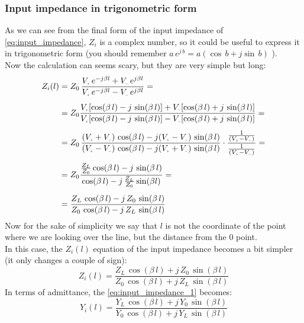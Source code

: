 \subsubsection*{Input impedance in trigonometric form}
As we can see from the final form of the input impedance of \cref{eq:input_impedance}, $Z_i$ is a complex number, so it could be useful to express it in trigonometric form (you should remember $a\,e^{j\,b}=a(\cos\,b+j\sin\,b)$ ).\\
Now the calculation can seems scary, but they are very simple but long:
\begin{align}
    \begin{split}
      Z_i(l)&=Z_0\,\frac{V\bottomPlus \,e^{-j\beta l}+V\bottomMinus \,e^{j\beta l}}{V\bottomPlus \,e^{-j\beta l}-V\bottomMinus \,e^{j\beta l}}=\\[5pt]
      &=Z_0\frac{V\bottomPlus [\cos(\beta\, l)-j \, \sin(\beta\, l)]+V\bottomMinus [\cos(\beta\, l)+j \, \sin(\beta\, l)]}{V\bottomPlus [\cos(\beta\, l)-j \, \sin(\beta\, l)]-V\bottomMinus [\cos(\beta\, l)+j \, \sin(\beta\, l)]}=\\[5pt]
      &=Z_0\,\frac{(V\bottomPlus +V\bottomMinus )\,\cos(\beta\,l)-j(V\bottomPlus -V\bottomMinus )\,\sin(\beta\, l)}{(V\bottomPlus -V\bottomMinus )\,\cos(\beta\,l)-j(V\bottomPlus +V\bottomMinus )\,\sin(\beta\, l)}\cdot \frac{\frac{1}{(V\bottomPlus-V\bottomMinus)}}{\frac{1}{(V\bottomPlus-V\bottomMinus)}}=\\[5pt]
      &=Z_0\frac{\frac{Z_L}{Z_0}\cos(\beta\,l)-j\,\sin(\beta \,l)}{\cos(\beta\, l)-j\,\frac{Z_L}{Z_0}\sin(\beta l)}=\\[5pt]
      &=\frac{Z_L\,\cos(\beta \,l)-j\,Z_0\,\sin(\beta \, l)}{Z_0\, \cos(\beta \, l)-j\,Z_L\,\sin(\beta \, l)}
    \end{split}
\end{align}
Now for the sake of simplicity we say that $l$ is not the coordinate of the point where we are looking over the line, but the distance from the $0$ point.\\
In this case, the $Z_i(l)$ equation of the input impedance becomes a bit simpler (it only changes a couple of sign):
\begin{equation}\label{eq:input_impedance_1}
    Z_i(l)=\frac{Z_L\,\cos(\beta \,l)+j\,Z_0\,\sin(\beta \, l)}{Z_0\, \cos(\beta \, l)+j\,Z_L\,\sin(\beta \, l)}
\end{equation}
In terms of admittance, the \cref{eq:input_impedance_1} becomes:
\begin{equation}
    Y_i(l)=\frac{Y_L\,\cos(\beta \,l)+j\,Y_0\,\sin(\beta \, l)}{Y_0\, \cos(\beta \, l)+j\,Y_L\,\sin(\beta \, l)}
\end{equation}
